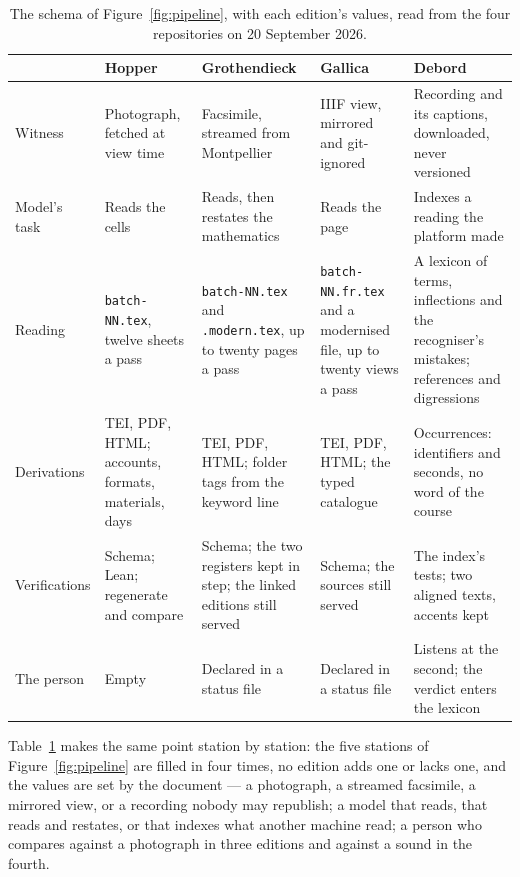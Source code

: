 \documentclass[11pt]{article}
\begin{document}
\begin{table}[htbp]\centering\small
\caption{The schema of Figure~\ref{fig:pipeline}, with each edition's values,
read from the four repositories on 20 September 2026.}\label{tab:params}
\begin{tabular}{>{\raggedright\arraybackslash}p{2.1cm}>{\raggedright\arraybackslash}p{2.9cm}>{\raggedright\arraybackslash}p{2.9cm}>{\raggedright\arraybackslash}p{2.9cm}>{\raggedright\arraybackslash}p{2.9cm}}\toprule
 & Hopper & Grothendieck & Gallica & Debord\\\midrule
Witness & Photograph, fetched at view time & Facsimile, streamed from Montpellier & IIIF view, mirrored and git-ignored & Recording and its captions, downloaded, never versioned\\
Model's task & Reads the cells & Reads, then restates the mathematics & Reads the page & Indexes a reading the platform made\\
Reading & \texttt{batch-NN.tex}, twelve sheets a pass & \texttt{batch-NN.tex} and \texttt{.modern.tex}, up to twenty pages a pass & \texttt{batch-NN.fr.tex} and a modernised file, up to twenty views a pass & A lexicon of terms, inflections and the recogniser's mistakes; references and digressions\\
Derivations & TEI, PDF, HTML; accounts, formats, materials, days & TEI, PDF, HTML; folder tags from the keyword line & TEI, PDF, HTML; the typed catalogue & Occurrences: identifiers and seconds, no word of the course\\
Verifications & Schema; Lean; regenerate and compare & Schema; the two registers kept in step; the linked editions still served & Schema; the sources still served & The index's tests; two aligned texts, accents kept\\
The person & Empty & Declared in a status file & Declared in a status file & Listens at the second; the verdict enters the lexicon\\\bottomrule
\end{tabular}
\end{table}

Table~\ref{tab:params} makes the same point station by station: the five
stations of Figure~\ref{fig:pipeline} are filled in four times, no edition
adds one or lacks one, and the values are set by the document --- a
photograph, a streamed facsimile, a mirrored view, or a recording nobody may
republish; a model that reads, that reads and restates, or that indexes what
another machine read; a person who compares against a photograph in three
editions and against a sound in the fourth.
\end{document}

